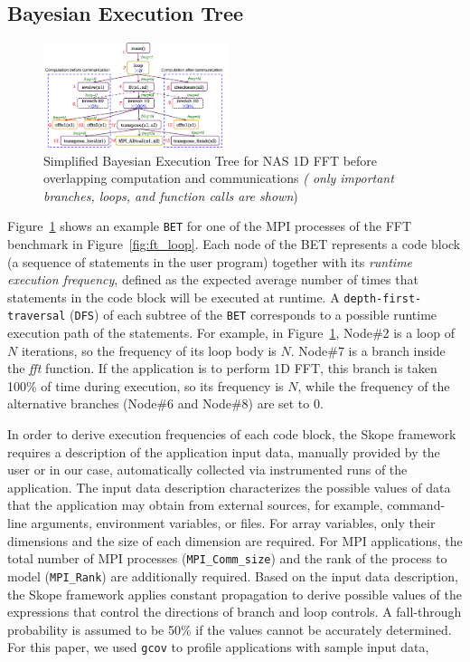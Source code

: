 \subsection {Bayesian Execution Tree}

\begin{figure}[h]
\begin{center}
\includegraphics[width=0.48\textwidth]{fig/ft_bet.png}
\caption{Simplified Bayesian Execution Tree for NAS 1D FFT before
  overlapping computation and communications \emph{(
    only important branches, loops, and function calls are shown})}
\label{fig:ft_bet}
\end{center}
\end{figure}

Figure~\ref{fig:ft_bet} shows an example \texttt{BET} for one of the
MPI processes of the FFT benchmark in Figure~\ref{fig:ft_loop}.
Each node of the BET represents a code block (a sequence of statements
in the user program) together with its \emph{runtime execution
  frequency}, defined as the expected average number of times that
statements in the code block will be executed at runtime.  A
\texttt{depth-first-traversal} (\texttt{DFS}) of each subtree of the
\texttt{BET} corresponds to a possible runtime execution path of the
statements.  For example, in Figure~\ref{fig:ft_bet}, Node\#2 is a
loop of $N$ iterations, so the frequency of its loop body is $N$.
Node\#7 is a branch inside the {\em fft} function. If the application is
to perform 1D FFT, this branch is taken 100\% of time during
execution, so its frequency is $N$, while the frequency of the
alternative branches (Node\#6 and Node\#8) are set to 0.

In order to derive execution frequencies of each code block, the Skope
framework requires a description of the application input data,
manually provided by the user or in our case,  automatically collected via 
instrumented runs of the application.  The input data description
characterizes the possible values of data that the application
may obtain from external sources, for example, command-line arguments,
environment variables, or files.  For array variables, only their
dimensions and the size of each dimension are required.  For MPI
applications, the total number of MPI processes
(\texttt{MPI\_Comm\_size}) and the rank of the process to model
(\texttt{MPI\_Rank}) are additionally required.  Based on the input
data description, the Skope framework applies constant propagation to
derive possible values of the expressions that control the directions
of branch and loop controls. A fall-through probability is assumed to be 50\% if the values cannot be accurately determined.  For this
paper, we used \texttt{gcov} to profile applications with sample input
data,



